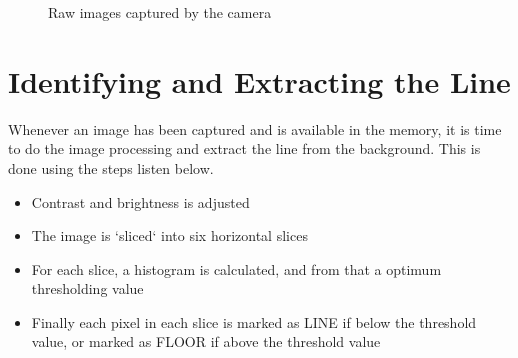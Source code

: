 \begin{figure}[ht]
	\centering
	\caption{Raw images captured by the camera}
	\label{fig:camera_1}
\end{figure}



%
%
%
%
\section{Identifying and Extracting the Line}

Whenever an image has been captured and is available in the memory, it is time to do the image processing and extract the line from the background. This is done using the steps listen below.

\begin{itemize}
	\item Contrast and brightness is adjusted
	\item The image is `sliced` into six horizontal slices
	\item For each slice, a histogram is calculated, and from that a optimum thresholding value
	\item Finally each pixel in each slice is marked as LINE if below the threshold value, or marked as FLOOR if above the threshold value
\end{itemize}


